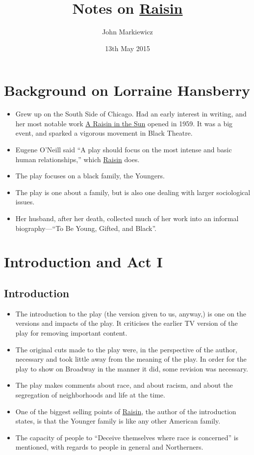 \documentclass[11pt]{article}
\begin{document}
\title{Notes on \underline{Raisin}}
\author{John Markiewicz}
\date{13th May 2015}
\maketitle
\section*{Background on Lorraine Hansberry}
\begin{itemize}
	\item Grew up on the South Side of Chicago.  Had an early interest in writing,
		and her most notable work \underline{A Raisin in the Sun} opened in 1959.  
		It was a big event, and sparked a vigorous movement in Black Theatre.
	\item Eugene O'Neill said ``A play should focus on the most intense and basic
		human relationships,'' which \underline{Raisin} does.
	\item The play focuses on a black family, the Youngers.
	\item The play is one about a family, but is also one dealing with larger 
		sociological issues.
	\item Her husband, after her death, collected much of her work into an 
		informal biography---``To Be Young, Gifted, and Black''.
\end{itemize}
\section{Introduction and Act I}
\subsection*{Introduction}
\begin{itemize}
	\item The introduction to the play (the version given to us, anyway,) is one
		on the versions and impacts of the play.  It criticises the earlier TV
		version of the play for removing important content.
	\item The original cuts made to the play were, in the perspective of the 
		author, necessary and took little away from the meaning of the play.  In
		order for the play to show on Broadway in the manner it did, some revision
		was necessary.
	\item The play makes comments about race, and about racism, and about the 
		segregation of neighborhoods and life at the time.
	\item One of the biggest selling points of \underline{Raisin}, the author of
		the introduction states, is that the Younger family is like any other 
		American family.
	\item The capacity of people to ``Deceive themselves where race is concerned''
		is mentioned, with regards to people in general and Northerners.
\end{itemize}
\end{document}
